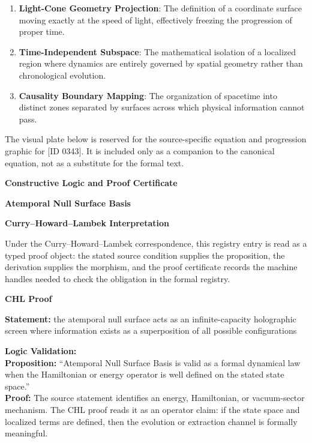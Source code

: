 \begin{enumerate}[leftmargin=1.6em,itemsep=6pt,topsep=4pt]
\item \textbf{Light-Cone Geometry Projection}: The definition of a coordinate surface moving exactly at the speed of light, effectively freezing the progression of proper time.
\item \textbf{Time-Independent Subspace}: The mathematical isolation of a localized region where dynamics are entirely governed by spatial geometry rather than chronological evolution.
\item \textbf{Causality Boundary Mapping}: The organization of spacetime into distinct zones separated by surfaces across which physical information cannot pass.
\end{enumerate}

\begingroup\footnotesize\sloppy
The visual plate below is reserved for the source-specific equation and progression graphic for [ID 0343]. It is included only as a companion to the canonical equation, not as a substitute for the formal text.
\par\endgroup
\ifTZPDarkEdition
{}
\fi

\clearpage
\begingroup\tzpsupportsetup
\noindent\textbf{\fontsize{10.8pt}{12.8pt}\selectfont [ID 0343] Constructive Logic and Proof Certificate}\par
\noindent\textbf{\fontsize{10pt}{12pt}\selectfont Atemporal Null Surface Basis}\par
\vspace{0.45em}
\begingroup
\footnotesize
\setlength{\parskip}{0.22em}
\setlength{\parindent}{0pt}
\noindent\textbf{Curry--Howard--Lambek Interpretation}\par
Under the Curry--Howard--Lambek correspondence, this registry entry is read as a typed proof
object: the stated source condition supplies the proposition, the derivation supplies the
morphism, and the proof certificate records the machine handles needed to check the obligation
in the formal registry.

\vspace{0.45em}
\noindent\textbf{CHL Proof}\par
\textbf{Statement:} the atemporal null surface acts as an infinite-capacity holographic screen where
information exists as a superposition of all possible configurations

\textbf{Logic Validation:}\\
\textbf{Proposition:} ``Atemporal Null Surface Basis is valid as a formal dynamical law when the Hamiltonian or
energy operator is well defined on the stated state space.''\\
\textbf{Proof:} The source statement identifies an energy, Hamiltonian, or vacuum-sector mechanism. The
CHL proof reads it as an operator claim: if the state space and localized terms are
defined, then the evolution or extraction channel is formally meaningful.

